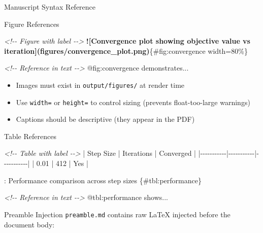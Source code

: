 \documentclass[
  ignorenonframetext,
]{beamer}
\newenvironment{Shaded}{}{}
\newcommand{\AlertTok}[1]{\textcolor[rgb]{1.00,0.00,0.00}{\textbf{#1}}}
\newcommand{\CommentTok}[1]{\textcolor[rgb]{0.38,0.63,0.69}{\textit{#1}}}
\newcommand{\NormalTok}[1]{#1}
\newcommand{\PreprocessorTok}[1]{\textcolor[rgb]{0.74,0.48,0.00}{#1}}
\providecommand{\tightlist}{%
  \setlength{\itemsep}{0pt}\setlength{\parskip}{0pt}}
\begin{document}
\begin{frame}[fragile]{Manuscript Syntax Reference}
\begin{block}{Figure References}
\protect{}\label{figure-references}
\begin{Shaded}
\begin{Highlighting}[]
\CommentTok{\textless{}!{-}{-} Figure with label {-}{-}\textgreater{}}
\AlertTok{![Convergence plot showing objective value vs iteration](figures/convergence\_plot.png)}\NormalTok{\{\#fig:convergence width=80\%\}}

\CommentTok{\textless{}!{-}{-} Reference in text {-}{-}\textgreater{}}
\NormalTok{@fig:convergence demonstrates...}
\end{Highlighting}
\end{Shaded}

\begin{itemize}
\tightlist
\item
  Images must exist in \texttt{output/figures/} at render time
\item
  Use \texttt{width=} or \texttt{height=} to control sizing (prevents
  float-too-large warnings)
\item
  Captions should be descriptive (they appear in the PDF)
\end{itemize}
\end{block}

\begin{block}{Table References}
\protect{}\label{table-references}
\begin{Shaded}
\begin{Highlighting}[]
\CommentTok{\textless{}!{-}{-} Table with label {-}{-}\textgreater{}}
\PreprocessorTok{|}\NormalTok{ Step Size }\PreprocessorTok{|}\NormalTok{ Iterations }\PreprocessorTok{|}\NormalTok{ Converged }\PreprocessorTok{|}
\PreprocessorTok{|{-}{-}{-}{-}{-}{-}{-}{-}{-}{-}{-}|{-}{-}{-}{-}{-}{-}{-}{-}{-}{-}{-}|{-}{-}{-}{-}{-}{-}{-}{-}{-}{-}{-}|}
\PreprocessorTok{|}\NormalTok{ 0.01      }\PreprocessorTok{|}\NormalTok{ 412       }\PreprocessorTok{|}\NormalTok{ Yes       }\PreprocessorTok{|}

\NormalTok{: Performance comparison across step sizes \{\#tbl:performance\}}

\CommentTok{\textless{}!{-}{-} Reference in text {-}{-}\textgreater{}}
\NormalTok{@tbl:performance shows...}
\end{Highlighting}
\end{Shaded}
\end{block}

\begin{block}{Preamble Injection}
\protect{}\label{preamble-injection}
\texttt{preamble.md} contains raw LaTeX injected before the document
body:


\end{block}
\end{frame}
\end{document}
